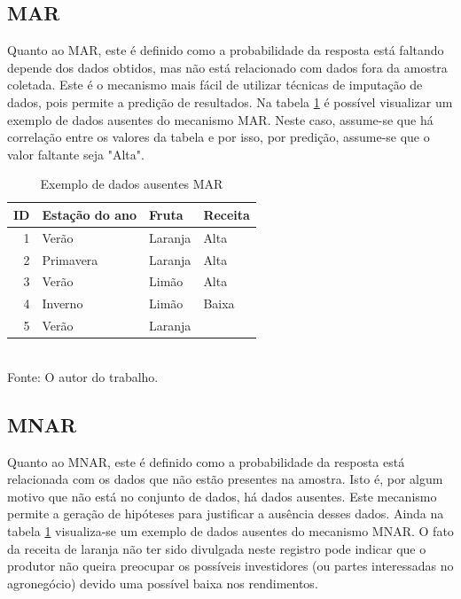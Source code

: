 \documentclass[
	12pt,				%
	openright,			%
	oneside,			%
	a4paper,			%
	english,			%
	brazil				%
	]{abntex2}
\begin{document}
		\subsection{MAR}
			Quanto ao MAR, este é definido como a probabilidade da resposta está faltando depende dos dados obtidos, mas não está relacionado com dados fora da amostra coletada.
			Este é o mecanismo mais fácil de utilizar técnicas de imputação de dados, pois permite a predição de resultados. \cite{molenberghs2014handbook} \cite{little2016missing}
			Na tabela \ref{table: exemplo DA MAR e DA MNAR} é possível visualizar um exemplo de dados ausentes do mecanismo MAR.
			Neste caso, assume-se que há correlação entre os valores da tabela e por isso, por predição, assume-se que o valor faltante seja "Alta".
			\begin{table}[h]
				\centering
				\caption{Exemplo de dados ausentes MAR}
				\vspace{0.5cm}
				\label{table: exemplo DA MAR e DA MNAR}
				\begin{tabular}{r|lll}
				
					ID & Estação do ano & Fruta & Receita \\ %
					\hline                               %
					1 & Verão     & Laranja & Alta  \\
					2 & Primavera & Laranja & Alta  \\
					3 & Verão     & Limão   & Alta  \\
					4 & Inverno   & Limão   & Baixa \\
					5 & Verão     & Laranja &         %
				
				\end{tabular}
				\bigskip
				\\
				\footnotesize Fonte: O autor do trabalho.
			\end{table}
		
		\subsection{MNAR}
			Quanto ao MNAR, este é definido como a probabilidade da resposta está relacionada com os dados que não estão presentes na amostra. \cite{molenberghs2014handbook} \cite{little2016missing}
			Isto é, por algum motivo que não está no conjunto de dados, há dados ausentes.
			Este mecanismo permite a geração de hipóteses para justificar a ausência desses dados. %
			Ainda na tabela \ref{table: exemplo DA MAR e DA MNAR} visualiza-se um exemplo de dados ausentes do mecanismo MNAR.
			O fato da receita de laranja não ter sido divulgada neste registro pode indicar que o produtor não queira preocupar os possíveis investidores (ou partes interessadas no agronegócio) devido uma possível baixa nos rendimentos.
			
\end{document}
